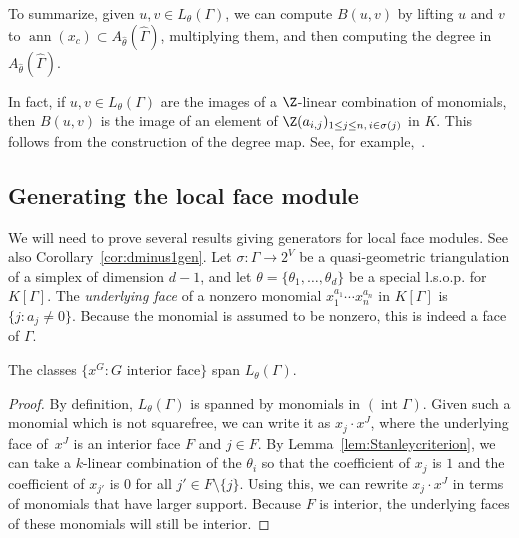 To summarize, given $u, v \in L_{\theta}(\Gamma)$, we can compute $B(u, v)$ by lifting $u$ and $v$ to $\operatorname{ann}(x_c) \subset A_{\hat{\theta}}(\hat{\Gamma})$, multiplying them, and then computing the degree in $A_{\hat{\theta}}(\hat{\Gamma})$. 

\begin{rema}\label{rem:Bindependentfield}
	 In fact, if $u, v \in L_{\theta}(\Gamma)$ are the images of a $\Z$-linear combination of monomials, then $B(u,v)$ is the image of an element of $\Z(a_{i,j})_{1 \le j \le n, \, i \in \sigma(j)}$ in $K$. 	This follows from the construction of the degree map. See, for example,~\cite[(1),(4)]{LNS}. 
\end{rema}

\subsection{Generating the local face module}

We will need to prove several results giving generators for local face modules. See also Corollary~\ref{cor:dminus1gen}. Let $\sigma \colon \Gamma \to 2^V$ be a quasi-geometric triangulation of a simplex of dimension $d-1$, and let $\theta = \{ \theta_1, \dotsc, \theta_d \}$ be a special l.s.o.p. for $K[\Gamma]$.
The \emph{underlying face} of a nonzero monomial $x_1^{a_1} \dotsb x_n^{a_n}$ in $K[\Gamma]$ is $\{j : a_j \not= 0\}$. Because the monomial is assumed to be nonzero, this is indeed a face of $\Gamma$. 

\begin{lemm}\label{lem:squarefree}
	The classes $\{x^G : G \text{ interior face}\}$ span $L_\theta(\Gamma)$. 
\end{lemm}

\begin{proof}
	By definition, $L_\theta(\Gamma)$ is spanned by monomials in $(\operatorname{int} \Gamma)$. Given such a monomial which is not squarefree, we can write it as $x_j \cdot x^J$, where the underlying face of~$x^J$ is an interior face $F$ and $j \in F$. 
	By Lemma~\ref{lem:Stanleycriterion}, 
	we can take a $k$-linear combination of the $\theta_i$ so that the coefficient of $x_j$ is $1$ and the coefficient of $x_{j'}$ is $0$ for all $j' \in F \setminus \{j\}$. Using this, we can rewrite $x_j \cdot x^J$ in terms of monomials that have larger support. Because $F$ is interior, the underlying faces of these monomials will still be interior. 
\end{proof}

